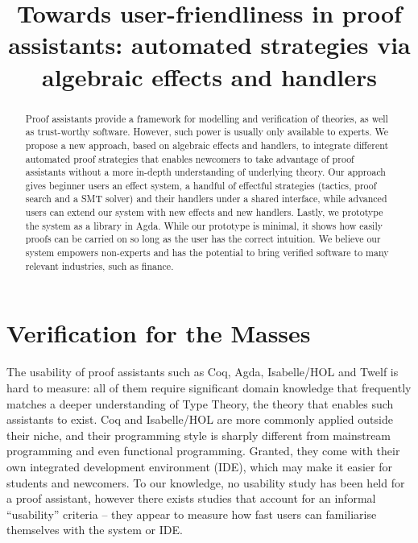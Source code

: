 \documentclass[sigconfl]{acmart}
\begin{document}
\title[Towards user-friendliness in proof assistants]{Towards user-friendliness
  in proof assistants: automated strategies \textbf{via} algebraic effects and handlers}



\begin{abstract}
Proof assistants provide a framework for modelling and verification of
theories, as well as trust-worthy software. However, such power is usually only
available to experts. We propose a new approach, based on algebraic effects and
handlers, to integrate different automated proof strategies that enables
newcomers to take advantage of proof assistants without a more in-depth
understanding of underlying theory. Our approach gives beginner users an effect
system, a handful of effectful strategies (tactics, proof search and a SMT
solver) and their handlers under a shared interface, while advanced users can
extend our system with new effects and new handlers. Lastly, we prototype the
system as a library in Agda. While our prototype is minimal, it shows how easily
proofs can be carried on so long as the user has the correct intuition. We
believe our system empowers non-experts and has the potential to bring verified
software to many relevant industries, such as finance.
\end{abstract}


\maketitle

\section{Verification for the Masses}

The usability of proof assistants such as Coq, Agda, Isabelle/HOL and Twelf is
hard to measure: all of them require significant domain knowledge that
frequently matches a deeper understanding of Type Theory, the theory that
enables such assistants to exist. Coq and Isabelle/HOL are more commonly applied
outside their niche, and their programming style is sharply different from
mainstream programming and even functional programming. Granted, they come with
their own integrated development environment (IDE), which may make it easier for
students and newcomers. To our knowledge, no usability study has been
held for a proof assistant, however there exists studies that account for
an informal ``usability'' criteria -- they appear to measure how fast users can
familiarise themselves with the system or IDE.
\end{document}
